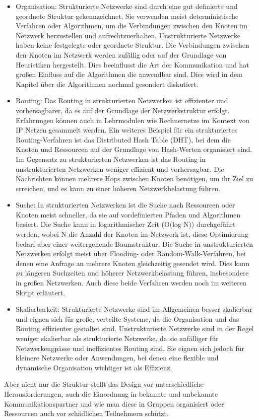 \begin{itemize} 
\item Organisation: Strukturierte Netzwerke sind durch eine gut definierte und geordnete Struktur gekennzeichnet. Sie verwenden meist deterministische Verfahren oder Algorithmen, um die Verbindungen zwischen den Knoten im Netzwerk herzustellen und aufrechtzuerhalten. Unstrukturierte Netzwerke haben keine festgelegte oder geordnete Struktur. Die Verbindungen zwischen den Knoten im Netzwerk werden zufällig oder auf der Grundlage von Heuristiken hergestellt. Dies beeinflusst die Art der Kommunikation und hat großen Einfluss auf die Algorithmen die anwendbar sind. Dies wird in dem Kapitel über die Algorithmen nochmal gesondert diskutiert.
\item Routing: Das Routing in strukturierten Netzwerken ist effizienter und vorhersagbarer, da es auf der Grundlage der Netzwerkstruktur erfolgt. Erfahrungen können auch in Lehrmodulen wie Rechnernetze im Kontext von IP Netzen gesammelt werden. Ein weiteres Beispiel für ein strukturiertes Routing-Verfahren ist das Distributed Hash Table (DHT), bei dem die Knoten und Ressourcen auf der Grundlage von Hash-Werten organisiert sind. Im Gegensatz zu strukturierten Netzwerken ist das Routing in unstrukturierten Netzwerken weniger effizient und vorhersagbar. Die Nachrichten können mehrere Hops zwischen Knoten benötigen, um ihr Ziel zu erreichen, und es kann zu einer höheren Netzwerkbelastung führen.
\item Suche: In strukturierten Netzwerken ist die Suche nach Ressourcen oder Knoten meist schneller, da sie auf vordefinierten Pfaden und Algorithmen basiert. Die Suche kann in logarithmischer Zeit (O(log N)) durchgeführt werden, wobei N die Anzahl der Knoten im Netzwerk ist, diese Optimierung bedarf aber einer weitergehende Baumstruktur. Die Suche in unstrukturierten Netzwerken erfolgt meist über Flooding- oder Random-Walk-Verfahren, bei denen eine Anfrage an mehrere Knoten gleichzeitig gesendet wird. Dies kann zu längeren Suchzeiten und höherer Netzwerkbelastung führen, insbesondere in großen Netzwerken. Auch diese beide Verfahren werden noch im weiteren Skript erläutert. 
\item Skalierbarkeit: Strukturierte Netzwerke sind im Allgemeinen besser skalierbar und eignen sich für große, verteilte Systeme, da die Organisation und das Routing effizienter gestaltet sind.
Unstrukturierte Netzwerke sind in der Regel weniger skalierbar als strukturierte Netzwerke, da sie anfälliger für Netzwerkengpässe und ineffizientes Routing sind. Sie eignen sich jedoch für kleinere Netzwerke oder Anwendungen, bei denen eine flexible und dynamische Organisation wichtiger ist als Effizienz.
\end{itemize} 
Aber nicht nur die Struktur stellt das Design vor unterschiedliche Herausforderungen, auch die Einordnung in bekannte und unbekannte Kommunikationspartner und wie man diese in Gruppen organisiert oder Ressourcen auch vor schädlichen Teilnehmern schützt.

